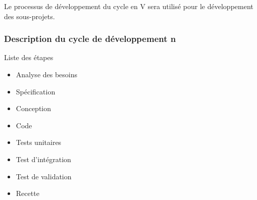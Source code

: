             Le processus de développement du cycle en V sera utilisé pour le
            développement des sous-projets.

        \subsubsection{Description du cycle de développement n}

            \par{Liste des étapes}
                \begin{itemize}
                    \item Analyse des besoins
                    \item Spécification
                    \item Conception
                    \item Code
                    \item Tests unitaires
                    \item Test d'intégration
                    \item Test de validation
                    \item Recette
                \end{itemize}
            

